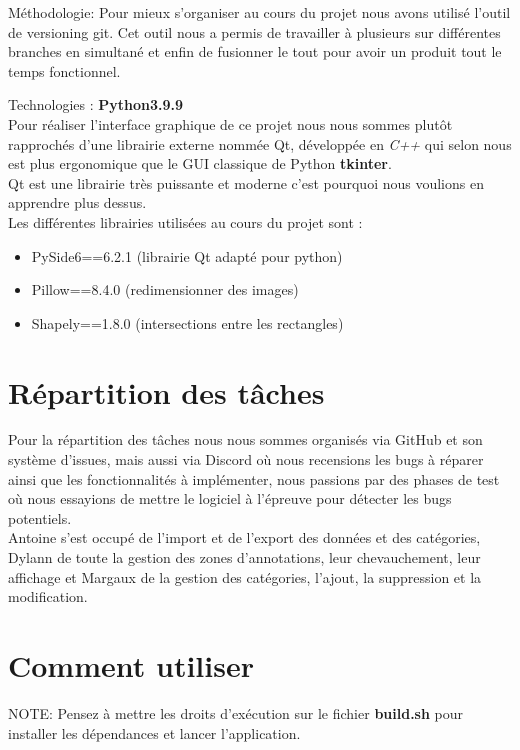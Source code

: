 \begin{description}
\item Méthodologie:
Pour mieux s'organiser au cours du projet nous avons utilisé l'outil de versioning git.
Cet outil nous a permis de travailler à plusieurs sur différentes branches en simultané et enfin de fusionner le tout pour avoir un produit tout le temps fonctionnel.

\item Technologies : \textbf{Python3.9.9}\\
Pour réaliser l'interface graphique de ce projet nous nous sommes plutôt rapprochés d'une librairie externe nommée Qt, développée en \textit{C++} qui selon nous est plus ergonomique que le GUI classique de Python \guillemotleft \textbf{tkinter}\guillemotright.\\
Qt est une librairie très puissante et moderne c'est pourquoi nous voulions en apprendre plus dessus.\\
Les différentes librairies utilisées au cours du projet sont :
    \begin{itemize}
        \item PySide6==6.2.1 (librairie Qt adapté pour python)
        \item Pillow==8.4.0 (redimensionner des images)
        \item Shapely==1.8.0 (intersections entre les rectangles)
    \end{itemize}
\end{description}



\section{Répartition des tâches}
Pour la répartition des tâches nous nous sommes organisés via GitHub et son système d'issues, mais aussi via Discord où nous recensions les bugs à réparer ainsi que les fonctionnalités à implémenter, nous passions par des phases de test où nous essayions de mettre le logiciel à l'épreuve pour détecter les bugs potentiels. \\

Antoine s'est occupé de l'import et de l'export des données et des catégories, Dylann de toute la gestion des zones d'annotations, leur chevauchement, leur affichage et Margaux de la gestion des catégories, l'ajout, la suppression et la modification.

\section{Comment utiliser}
NOTE: Pensez à mettre les droits d'exécution sur le fichier \textbf{build.sh} pour installer les dépendances et lancer l'application.

